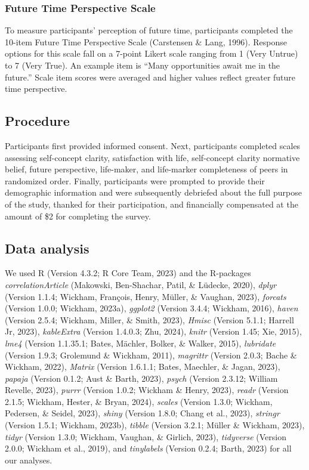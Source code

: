 \documentclass[
  man,floatsintext]{apa6}
\begin{document}
\hypertarget{future-time-perspective-scale}{%
\subsubsection{Future Time Perspective Scale}\label{future-time-perspective-scale}}

To measure participants' perception of future time, participants completed the 10-item Future Time Perspective Scale (Carstensen \& Lang, 1996). Response options for this scale fall on a 7-point Likert scale ranging from 1 (Very Untrue) to 7 (Very True). An example item is ``Many opportunities await me in the future.'' Scale item scores were averaged and higher values reflect greater future time perspective.

\hypertarget{procedure}{%
\subsection{Procedure}\label{procedure}}

Participants first provided informed consent. Next, participants completed scales assessing self-concept clarity, satisfaction with life, self-concept clarity normative belief, future perspective, life-maker, and life-marker completeness of peers in randomized order. Finally, participants were prompted to provide their demographic information and were subsequently debriefed about the full purpose of the study, thanked for their participation, and financially compensated at the amount of \$2 for completing the survey.

\hypertarget{data-analysis}{%
\subsection{Data analysis}\label{data-analysis}}

We used R (Version 4.3.2; R Core Team, 2023) and the R-packages \emph{correlationArticle} (Makowski, Ben-Shachar, Patil, \& Lüdecke, 2020), \emph{dplyr} (Version 1.1.4; Wickham, François, Henry, Müller, \& Vaughan, 2023), \emph{forcats} (Version 1.0.0; Wickham, 2023a), \emph{ggplot2} (Version 3.4.4; Wickham, 2016), \emph{haven} (Version 2.5.4; Wickham, Miller, \& Smith, 2023), \emph{Hmisc} (Version 5.1.1; Harrell Jr, 2023), \emph{kableExtra} (Version 1.4.0.3; Zhu, 2024), \emph{knitr} (Version 1.45; Xie, 2015), \emph{lme4} (Version 1.1.35.1; Bates, Mächler, Bolker, \& Walker, 2015), \emph{lubridate} (Version 1.9.3; Grolemund \& Wickham, 2011), \emph{magrittr} (Version 2.0.3; Bache \& Wickham, 2022), \emph{Matrix} (Version 1.6.1.1; Bates, Maechler, \& Jagan, 2023), \emph{papaja} (Version 0.1.2; Aust \& Barth, 2023), \emph{psych} (Version 2.3.12; William Revelle, 2023), \emph{purrr} (Version 1.0.2; Wickham \& Henry, 2023), \emph{readr} (Version 2.1.5; Wickham, Hester, \& Bryan, 2024), \emph{scales} (Version 1.3.0; Wickham, Pedersen, \& Seidel, 2023), \emph{shiny} (Version 1.8.0; Chang et al., 2023), \emph{stringr} (Version 1.5.1; Wickham, 2023b), \emph{tibble} (Version 3.2.1; Müller \& Wickham, 2023), \emph{tidyr} (Version 1.3.0; Wickham, Vaughan, \& Girlich, 2023), \emph{tidyverse} (Version 2.0.0; Wickham et al., 2019), and \emph{tinylabels} (Version 0.2.4; Barth, 2023) for all our analyses.
\end{document}
